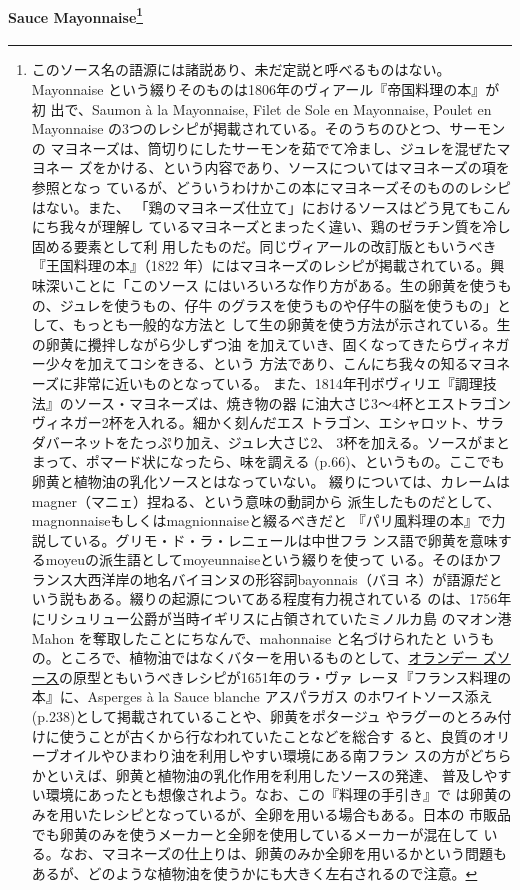 \begin{recette}
{\paragraph[Sauce Mayonnaise]{\texorpdfstring{Sauce Mayonnaise\footnote{このソース名の語源には諸説あり、未だ定説と呼べるものはない。
  Mayonnaise という綴りそのものは1806年のヴィアール『帝国料理の本』が初
  出で、Saumon à la Mayonnaise, Filet de Sole en Mayonnaise, Poulet en
  Mayonnaise の3つのレシピが掲載されている。そのうちのひとつ、サーモンの
  マヨネーズは、筒切りにしたサーモンを茹でて冷まし、ジュレを混ぜたマヨネー
  ズをかける、という内容であり、ソースについてはマヨネーズの項を参照となっ
  ているが、どういうわけかこの本にマヨネーズそのもののレシピはない。また、
  「鶏のマヨネーズ仕立て」におけるソースはどう見てもこんにち我々が理解し
  ているマヨネーズとまったく違い、鶏のゼラチン質を冷し固める要素として利
  用したものだ。同じヴィアールの改訂版ともいうべき『王国料理の本』（1822
  年）にはマヨネーズのレシピが掲載されている。興味深いことに「このソース
  にはいろいろな作り方がある。生の卵黄を使うもの、ジュレを使うもの、仔牛
  のグラスを使うものや仔牛の脳を使うもの」として、もっとも一般的な方法と
  して生の卵黄を使う方法が示されている。生の卵黄に攪拌しながら少しずつ油
  を加えていき、固くなってきたらヴィネガー少々を加えてコシをきる、という
  方法であり、こんにち我々の知るマヨネーズに非常に近いものとなっている。
  また、1814年刊ボヴィリエ『調理技法』のソース・マヨネーズは、焼き物の器
  に油大さじ3〜4杯とエストラゴンヴィネガー2杯を入れる。細かく刻んだエス
  トラゴン、エシャロット、サラダバーネットをたっぷり加え、ジュレ大さじ2、
  3杯を加える。ソースがまとまって、ポマード状になったら、味を調える
  (p.66)、というもの。ここでも卵黄と植物油の乳化ソースとはなっていない。
  綴りについては、カレームはmagner（マニェ）捏ねる、という意味の動詞から
  派生したものだとして、magnonnaiseもしくはmagnionnaiseと綴るべきだと
  『パリ風料理の本』で力説している。グリモ・ド・ラ・レニェールは中世フラ
  ンス語で卵黄を意味するmoyeuの派生語としてmoyeunnaiseという綴りを使って
  いる。そのほかフランス大西洋岸の地名バイヨンヌの形容詞bayonnais（バヨ
  ネ）が語源だという説もある。綴りの起源についてある程度有力視されている
  のは、1756年にリシュリュー公爵が当時イギリスに占領されていたミノルカ島
  のマオン港 Mahon を奪取したことにちなんで、mahonnaise と名づけられたと
  いうもの。ところで、植物油ではなくバターを用いるものとして、\protect\hyperlink{sauce-hollandaise}{オランデー
  ズソース}の原型ともいうべきレシピが1651年のラ・ヴァ
  レーヌ『フランス料理の本』に、Asperges à la Sauce blanche アスパラガス
  のホワイトソース添え(p.238)として掲載されていることや、卵黄をポタージュ
  やラグーのとろみ付けに使うことが古くから行なわれていたことなどを総合す
  ると、良質のオリーブオイルやひまわり油を利用しやすい環境にある南フラン
  スの方がどちらかといえば、卵黄と植物油の乳化作用を利用したソースの発達、
  普及しやすい環境にあったとも想像されよう。なお、この『料理の手引き』で
  は卵黄のみを用いたレシピとなっているが、全卵を用いる場合もある。日本の
  市販品でも卵黄のみを使うメーカーと全卵を使用しているメーカーが混在して
  いる。なお、マヨネーズの仕上りは、卵黄のみか全卵を用いるかという問題も
  あるが、どのような植物油を使うかにも大きく左右されるので注意。}}{Sauce Mayonnaise}}\label{mayonnaise}}


\end{recette}
